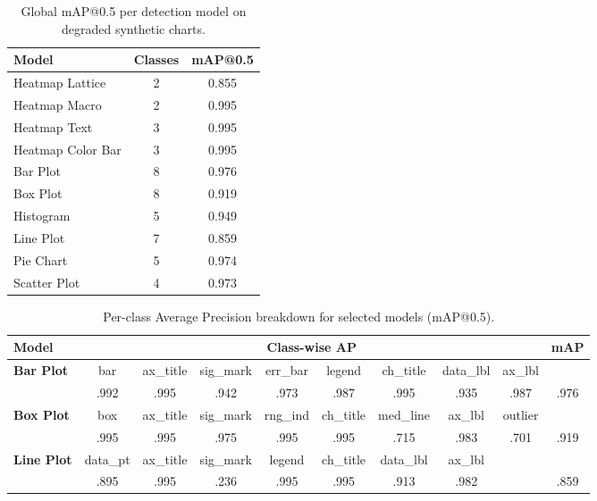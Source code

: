 \documentclass[11pt,twocolumn]{article}
\begin{document}
\begin{table}[htbp]
\centering
\caption{Global mAP@0.5 per detection model on degraded synthetic charts.}\label{tab:evaluation_results}
\small
\begin{tabular}{l c c}
\toprule
\textbf{Model} & \textbf{Classes} & \textbf{mAP@0.5} \\
\midrule
Heatmap Lattice    & 2  & 0.855 \\
Heatmap Macro      & 2  & 0.995 \\
Heatmap Text       & 3  & 0.995 \\
Heatmap Color Bar  & 3  & 0.995 \\
Bar Plot           & 8  & 0.976 \\
Box Plot           & 8  & 0.919 \\
Histogram          & 5  & 0.949 \\
Line Plot          & 7  & 0.859 \\
Pie Chart          & 5  & 0.974 \\
Scatter Plot       & 4  & 0.973 \\
\bottomrule
\end{tabular}
\end{table}

\begin{table}[htbp]
\centering
\caption{Per-class Average Precision breakdown for selected models (mAP@0.5).}\label{tab:class_ap}
\small
\setlength{\tabcolsep}{4pt}
\begin{tabular}{l *{8}{c} c}
\toprule
\textbf{Model} & \multicolumn{8}{c}{\textbf{Class-wise AP}} & \textbf{mAP} \\
\cmidrule(lr){2-9}
\midrule
\textbf{Bar Plot} & bar & ax\_title & sig\_mark & err\_bar & legend & ch\_title & data\_lbl & ax\_lbl & \\
 & .992 & .995 & .942 & .973 & .987 & .995 & .935 & .987 & .976 \\
\addlinespace
\textbf{Box Plot} & box & ax\_title & sig\_mark & rng\_ind & ch\_title & med\_line & ax\_lbl & outlier & \\
 & .995 & .995 & .975 & .995 & .995 & .715 & .983 & .701 & .919 \\
\addlinespace
\textbf{Line Plot} & data\_pt & ax\_title & sig\_mark & legend & ch\_title & data\_lbl & ax\_lbl & & \\
 & .895 & .995 & .236 & .995 & .995 & .913 & .982 & & .859 \\
\bottomrule
\end{tabular}
\end{table}
\end{document}
